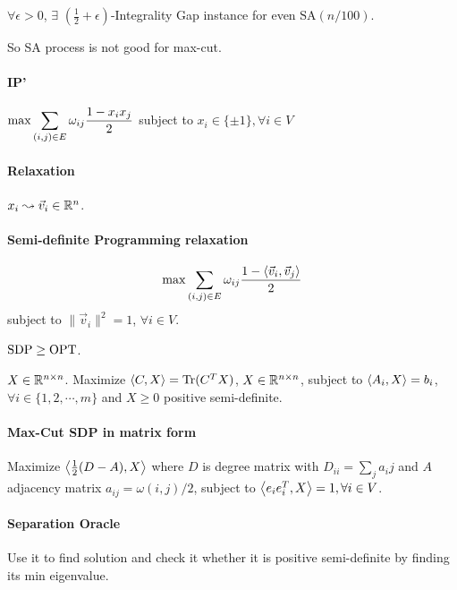 \begin{theorem}
    $ \forall \epsilon>0 $,  $ \exists  $  $ (\frac{1}{2}+\epsilon) $-Integrality Gap instance for even  $ \mathrm{SA}(n/100) $.
\end{theorem}

So SA process is not good for max-cut.

\paragraph{IP'}  $ \max \displaystyle\sum_{(i,j)\in E}\omega_{ij}\frac{1-x_ix_j}{2} $ subject to  $ x_i\in\{\pm 1\},\forall i\in V $ 

\paragraph{Relaxation}  $ x_i\leadsto \vec{v}_i\in \mathbb R^n $.

\paragraph{Semi-definite Programming relaxation}
\[\max \sum_{(i,j)\in E}\omega_{ij}\frac{1-\left<\vec{v}_i,\vec{v}_j\right>}{2}\]
subject to  $ \|\vec{v}_i\|^2=1 $,  $ \forall i\in V $.

\begin{fact}
    $ \mathrm{SDP} \geq \mathrm{OPT} $. 
\end{fact}

\begin{definition}
    $ X\in \mathbb R^{n\times n} $. Maximize  $ \left<C,X\right>=\mathrm{Tr}(C^TX) $,  $ X\in \mathbb R^{n\times n} $, subject to  $ \left<A_i,X\right>=b_i $,  $ \forall i\in\{1,2,\cdots, m\} $ and  $ X \geq 0 $ positive semi-definite.    
\end{definition}

\paragraph{Max-Cut SDP in matrix form}
Maximize  $ \left<\frac{1}{2}(D-A),X\right> $ where  $ D $ is degree matrix with  $ D_{ii}=\sum_{j}a_ij $ and  $ A $ adjacency matrix  $ a_{ij}=\omega(i,j)/2 $, subject to  $ \left<e_ie_i^T,X\right>=1,\forall i\in V $.

\paragraph{Separation Oracle} Use it to find solution and check it whether it is positive semi-definite by finding its min eigenvalue.

